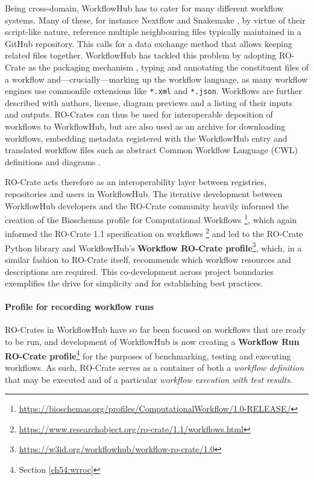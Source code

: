 Being cross-domain, WorkflowHub has to cater for many different workflow systems. Many of these, for instance Nextflow \cite{Di Tommaso 2017} and Snakemake \cite{Köster 2012}, by virtue of their script-like nature, reference multiple neighbouring files typically maintained in a GitHub repository.
This calls for a data exchange method that allows keeping related files together.
WorkflowHub has tackled this problem by adopting RO-Crate as the packaging mechanism \cite{Bietrix 2021}, typing and annotating the constituent files of a workflow and---crucially---marking up the workflow language, as many workflow engines use commonfile extensions like \texttt{*.xml} and \texttt{*.json}. Workflows are further described with authors, license, diagram previews and a listing of their inputs and outputs.
RO-Crates can thus be used for interoperable deposition of workflows to WorkflowHub, but are also used as an archive for downloading workflows, embedding metadata registered with the WorkflowHub entry and translated workflow files such as abstract Common Workflow Language (CWL) \cite{Crusoe 2022} definitions and diagrams \cite{Goble 2021}.

RO-Crate acts therefore as an interoperability layer between registries,
repositories and users in WorkflowHub. The iterative development between
WorkflowHub developers and the RO-Crate community heavily informed the
creation of the Bioschemas
\cite{Gray 2017} profile for Computational
Workflows \footnote{\url{https://bioschemas.org/profiles/ComputationalWorkflow/1.0-RELEASE/}}, which again informed the
RO-Crate
1.1 specification on workflows \footnote{\url{https://www.researchobject.org/ro-crate/1.1/workflows.html}} and led to the RO-Crate Python library
\cite{De Geest 2023a} and
WorkflowHub's
\textbf{Workflow
RO-Crate profile}\footnote{\url{https://w3id.org/workflowhub/workflow-ro-crate/1.0}}, which, in a similar fashion to RO-Crate itself,
recommends which workflow resources and descriptions are required. This
co-development across project boundaries exemplifies the drive for
simplicity and for establishing best practices.

\paragraph{Profile for recording workflow runs}
\label{ch5:profile-for-recording-workflow-runs}

RO-Crates in WorkflowHub have so far been focused on workflows that are
ready to be run, and development of WorkflowHub is now creating a
\textbf{Workflow Run RO-Crate profile}\footnote{Section \vref{ch54:wrroc}} for the purposes of benchmarking,
testing and executing workflows. As such, RO-Crate serves as a container
of both a \emph{workflow definition} that may be executed and of a
particular \emph{workflow execution with test results}.

